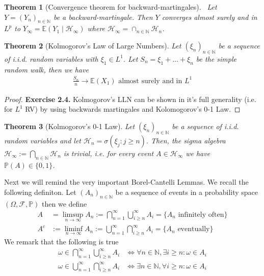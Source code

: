 \documentclass[11pt,a4paper, final]{article}
\newtheorem{thm}{Theorem}[section]
\theoremstyle{definition}
\begin{document}
\begin{thm}[Convergence theorem for backward-martingales] \ \newline Let $Y=(Y_n)_{n \in \mathbb{N}}$ be a backward-martingale. Then $Y$ converges almost surely and in $L^p$ to $Y_\infty = \mathbb{E}(Y_1 \mid \mathcal{H}_\infty )$ where $\mathcal{H}_\infty = \cap_{n \in \mathbb{N}} \mathcal{H}_n$. 
\end{thm}
\begin{thm}[Kolmogorov's Law of Large Numbers] Let $(\xi_n)_{n \in \mathbb{N}}$ be a sequence of i.i.d. random variables with $\xi_1 \in L^1$. Let $S_n = \xi_1 + \dots + \xi_n$ be the simple random walk, then we have
\begin{align*}
\frac{S_n}{n} \to \mathbb{E}(X_1) \text{ almost surely and in } L^1
\end{align*}
\end{thm}
\begin{proof}
\textbf{Exercise 2.4.} Kolmogorov's LLN can be shown in it's full generality (i.e. for $L^1$ RV) by using backwards martingales and Kolomogorov's 0-1 Law. 
\end{proof}
\begin{thm}[Kolmogorov's 0-1 Law] Let $(\xi_n)_{n \in \mathbb{N}}$ be a sequence of i.i.d. random variables and let $\mathcal{H}_n = \sigma( \xi_j : j \geq n )$. Then, the sigma algebra $\mathcal{H}_\infty := \bigcap_{n \in \mathbb{N}} \mathcal{H}_n$ is trivial, i.e. for every event $A \in \mathcal{H}_\infty$ we have  \\ $\mathbb{P}(A) \in \lbrace 0 ,1 \rbrace$. 
\end{thm}
\noindent Next we will remind the very important Borel-Cantelli Lemmas. We recall the following definiton. Let $(A_n)_{n \in \mathbb{N}}$ be a sequence of events in a probability space $( \Omega, \mathcal{F}, \mathbb{P})$ then we define 
\begin{align*}
A & = \limsup_{n \to \infty} A_n:= \bigcap_{n=1}^\infty \bigcup_{i \geq n}^\infty A_i = \lbrace A_n \text{ infinitely often} \rbrace  
\\
A^c &:= \liminf_{n \to \infty} A_n := \bigcup_{n=1}^\infty \bigcap_{i \geq n }^\infty A_i = \lbrace A_n \text{ eventually} \rbrace 
\end{align*}
We remark that the following is true
\begin{align*}
\omega \in \bigcap_{n=1}^\infty \bigcup_{i \geq n}^\infty A_i &\iff \forall n \in \mathbb{N}, \exists i \geq n : \omega \in A_i   \\
\omega \in \bigcup_{n=1}^\infty \bigcap_{i \geq n }^\infty A_i &\iff \exists n \in \mathbb{N}, \forall i \geq n : \omega \in A_i
\end{align*}
\end{document}
